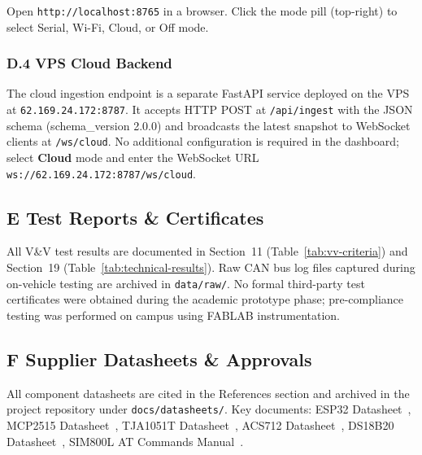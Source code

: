Open \texttt{http://localhost:8765} in a browser. Click the mode pill (top-right) to select Serial, Wi-Fi, Cloud, or Off mode.

\subsubsection*{D.4 \quad VPS Cloud Backend}

The cloud ingestion endpoint is a separate FastAPI service deployed on the VPS at \texttt{62.169.24.172:8787}. It accepts HTTP POST at \texttt{/api/ingest} with the JSON schema (schema\_version 2.0.0) and broadcasts the latest snapshot to WebSocket clients at \texttt{/ws/cloud}. No additional configuration is required in the dashboard; select \textbf{Cloud} mode and enter the WebSocket URL \texttt{ws://62.169.24.172:8787/ws/cloud}.

\clearpage

\subsection*{E \quad Test Reports \& Certificates}

All V\&V test results are documented in Section~11 (Table~\ref{tab:vv-criteria}) and Section~19 (Table~\ref{tab:technical-results}). Raw CAN bus log files captured during on-vehicle testing are archived in \texttt{data/raw/}. No formal third-party test certificates were obtained during the academic prototype phase; pre-compliance testing was performed on campus using FABLAB instrumentation.

\clearpage

\subsection*{F \quad Supplier Datasheets \& Approvals}

All component datasheets are cited in the References section and archived in the project repository under \texttt{docs/datasheets/}. Key documents: ESP32 Datasheet~\cite{esp32datasheet}, MCP2515 Datasheet~\cite{mcp2515datasheet}, TJA1051T Datasheet~\cite{tja1051datasheet}, ACS712 Datasheet~\cite{acs712datasheet}, DS18B20 Datasheet~\cite{ds18b20datasheet}, SIM800L AT Commands Manual~\cite{sim800latcommands}.

